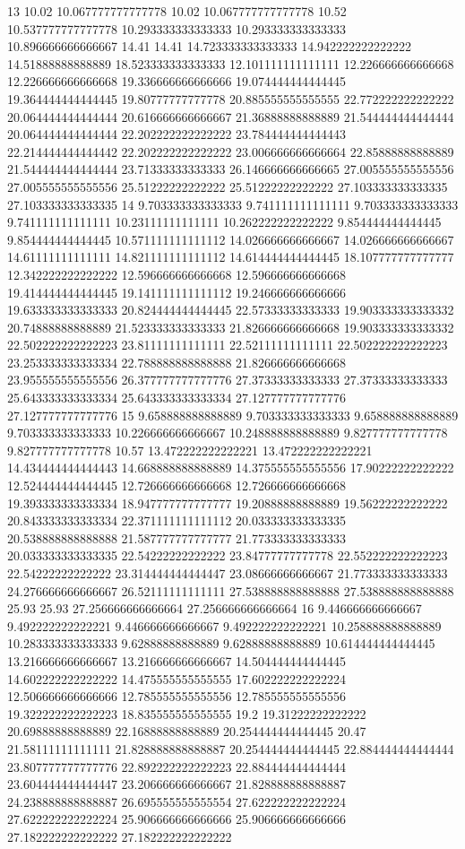 13 10.02 10.067777777777778 10.02 10.067777777777778 10.52 10.537777777777778 10.293333333333333 10.293333333333333 10.896666666666667 14.41 14.41 14.723333333333333 14.942222222222222 14.51888888888889 18.523333333333333 12.101111111111111 12.226666666666668 12.226666666666668 19.336666666666666 19.074444444444445 19.364444444444445 19.80777777777778 20.885555555555555 22.772222222222222 20.064444444444444 20.616666666666667 21.36888888888889 21.544444444444444 20.064444444444444 22.202222222222222 23.784444444444443 22.214444444444442 22.202222222222222 23.006666666666664 22.85888888888889 21.544444444444444 23.71333333333333 26.146666666666665 27.005555555555556 27.005555555555556 25.51222222222222 25.51222222222222 27.103333333333335 27.103333333333335
14 9.703333333333333 9.741111111111111 9.703333333333333 9.741111111111111 10.23111111111111 10.262222222222222 9.854444444444445 9.854444444444445 10.571111111111112 14.026666666666667 14.026666666666667 14.61111111111111 14.821111111111112 14.614444444444445 18.107777777777777 12.342222222222222 12.596666666666668 12.596666666666668 19.414444444444445 19.141111111111112 19.246666666666666 19.633333333333333 20.824444444444445 22.57333333333333 19.903333333333332 20.74888888888889 21.523333333333333 21.826666666666668 19.903333333333332 22.502222222222223 23.81111111111111 22.52111111111111 22.502222222222223 23.253333333333334 22.788888888888888 21.826666666666668 23.955555555555556 26.377777777777776 27.37333333333333 27.37333333333333 25.643333333333334 25.643333333333334 27.127777777777776 27.127777777777776
15 9.658888888888889 9.703333333333333 9.658888888888889 9.703333333333333 10.226666666666667 10.248888888888889 9.827777777777778 9.827777777777778 10.57 13.472222222222221 13.472222222222221 14.434444444444443 14.668888888888889 14.375555555555556 17.90222222222222 12.524444444444445 12.726666666666668 12.726666666666668 19.393333333333334 18.947777777777777 19.20888888888889 19.56222222222222 20.843333333333334 22.371111111111112 20.033333333333335 20.538888888888888 21.587777777777777 21.773333333333333 20.033333333333335 22.54222222222222 23.84777777777778 22.552222222222223 22.54222222222222 23.314444444444447 23.08666666666667 21.773333333333333 24.276666666666667 26.52111111111111 27.538888888888888 27.538888888888888 25.93 25.93 27.256666666666664 27.256666666666664
16 9.446666666666667 9.492222222222221 9.446666666666667 9.492222222222221 10.258888888888889 10.283333333333333 9.62888888888889 9.62888888888889 10.614444444444445 13.216666666666667 13.216666666666667 14.504444444444445 14.602222222222222 14.475555555555555 17.602222222222224 12.506666666666666 12.785555555555556 12.785555555555556 19.322222222222223 18.835555555555555 19.2 19.31222222222222 20.69888888888889 22.16888888888889 20.254444444444445 20.47 21.58111111111111 21.828888888888887 20.254444444444445 22.884444444444444 23.807777777777776 22.892222222222223 22.884444444444444 23.604444444444447 23.206666666666667 21.828888888888887 24.238888888888887 26.695555555555554 27.622222222222224 27.622222222222224 25.906666666666666 25.906666666666666 27.182222222222222 27.182222222222222

